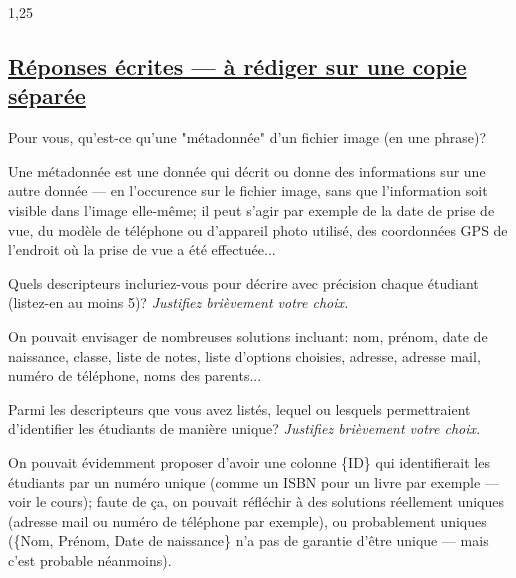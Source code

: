 \documentclass[11pt,a4paper]{exam}
\begin{document}
\begin{spacing}{1,25}
\begin{questions}
\begin{parts}
        		\part{\underline{Réponses écrites --- à rédiger sur une copie séparée}}
        		\addpoints
        		\begin{subparts}
        			\subpart[2]Pour vous, qu'est-ce qu'une "métadonnée" d'un fichier image (en une phrase)?
        			\begin{solution}
        				Une métadonnée est une donnée qui décrit ou donne des informations sur une autre donnée --- en l'occurence sur le fichier image, sans que l'information soit visible dans l'image elle-même; il peut s'agir par exemple de la date de prise de vue, du modèle de téléphone ou d'appareil photo utilisé, des coordonnées GPS de l'endroit où la prise de vue a été effectuée...
        			\end{solution}
        			\begin{subsubparts}
        				\subsubpart[2] Quels descripteurs incluriez-vous pour décrire avec précision chaque étudiant (listez-en au moins 5)? \textit{Justifiez brièvement votre choix.}
        				\begin{solution}
        					On pouvait envisager de nombreuses solutions incluant: nom, prénom, date de naissance, classe, liste de notes, liste d'options choisies, adresse, adresse mail, numéro de téléphone, noms des parents...
        				\end{solution}
        				\subsubpart[2] Parmi les descripteurs que vous avez listés, lequel ou lesquels permettraient d'identifier les étudiants de manière unique? \textit{Justifiez brièvement votre choix.}
        				\begin{solution}
        					On pouvait évidemment proposer d'avoir une colonne \{ID\} qui identifierait les étudiants par un numéro unique (comme un ISBN pour un livre par exemple --- voir le cours); faute de ça, on pouvait réfléchir à des solutions réellement uniques (adresse mail ou numéro de téléphone par exemple), ou probablement uniques (\{Nom, Prénom, Date de naissance\} n'a pas de garantie d'être unique --- mais c'est probable néanmoins).
        				\end{solution}
        			\end{subsubparts} 
        			

\end{subparts}
\end{parts}
\end{questions}
\end{spacing}
\end{document}
